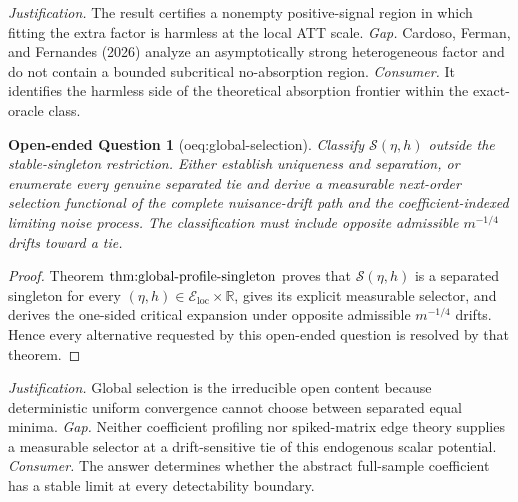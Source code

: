 \documentclass{article}
\newtheorem{openendedquestion}{Open-ended Question}
\begin{document}
\par\smallskip\noindent \textit{Justification.} The result certifies a nonempty positive-signal region in which fitting the extra factor is harmless at the local ATT scale. \textit{Gap.} Cardoso, Ferman, and Fernandes (2026) analyze an asymptotically strong heterogeneous factor and do not contain a bounded subcritical no-absorption region. \textit{Consumer.} It identifies the harmless side of the theoretical absorption frontier within the exact-oracle class.

\begin{openendedquestion}[oeq:global-selection]\label{oeq:global-selection}
Classify \(\mathcal S(\eta,h)\) outside the stable-singleton restriction. Either establish uniqueness and separation, or enumerate every genuine separated tie and derive a measurable next-order selection functional of the complete nuisance-drift path and the coefficient-indexed limiting noise process. The classification must include opposite admissible \(m^{-1/4}\) drifts toward a tie.
\end{openendedquestion}
\begin{proof}
Theorem \(\textnormal{thm:global-profile-singleton}\) proves that \(\mathcal S(\eta,h)\) is a separated singleton for every \((\eta,h)\in\mathcal E_{\mathrm{loc}}\times\mathbb R\), gives its explicit measurable selector, and derives the one-sided critical expansion under opposite admissible \(m^{-1/4}\) drifts. Hence every alternative requested by this open-ended question is resolved by that theorem.
\end{proof}
\par\smallskip\noindent \textit{Justification.} Global selection is the irreducible open content because deterministic uniform convergence cannot choose between separated equal minima. \textit{Gap.} Neither coefficient profiling nor spiked-matrix edge theory supplies a measurable selector at a drift-sensitive tie of this endogenous scalar potential. \textit{Consumer.} The answer determines whether the abstract full-sample coefficient has a stable limit at every detectability boundary.
\end{document}
